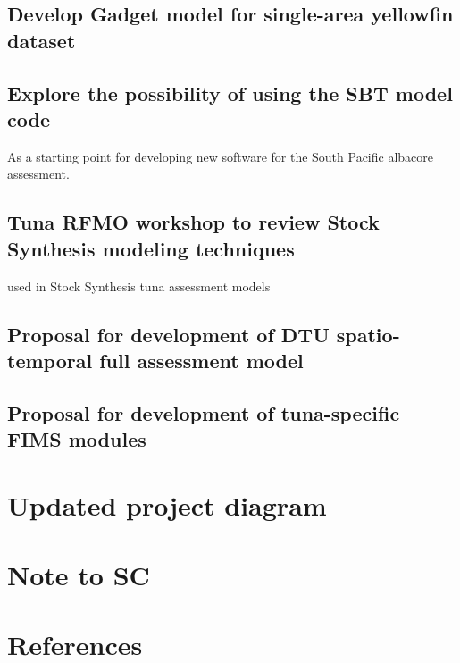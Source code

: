 \documentclass{SCreport}
\begin{document}
\subsection{Develop Gadget model for single-area yellowfin dataset}
\label{sec:yft-gadget}

\subsection{Explore the possibility of using the SBT model code}

As a starting point for developing new software for the South Pacific albacore
assessment.

\subsection{Tuna RFMO workshop to review Stock Synthesis modeling techniques}
\label{sec:ss-workshop}

used in Stock Synthesis tuna assessment models

\subsection{Proposal for development of DTU spatio-temporal full assessment
  model}
\label{sec:dtu-support-assessment}

\subsection{Proposal for development of tuna-specific FIMS modules}

\section{Updated project diagram}

\section{Note to SC}

\section{References}

\sloppy\setlength{}
\end{document}
